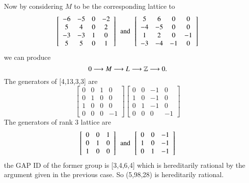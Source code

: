 Now by considering $M$ to be the corresponding lattice to 
$$
\left[ \begin {array}{cccc} -6&-5&0&-2\\5&4&0&2
\\-3&-3&1&0\\5&5&0&1\end {array}
 \right] 
 \,\,\, \text{and} \,\,\,
 \left[ \begin {array}{cccc} 5&6&0&0\\-4&-5&0&0
\\1&2&0&-1\\-3&-4&-1&0
\end {array} \right] 
$$
we can produce
$$
0 \longrightarrow M_{} \longrightarrow L_{} \longrightarrow \mathbb{Z} \longrightarrow 0
.$$
The generators of [4,13,3,3] are 
$$
 \left[ \begin {array}{ccc|c} 0&0&1&0\\ 0&1&0&0
\\ 1&0&0&0\\ \hline 0&0&0&-1\end {array}
 \right] 
 \left[ \begin {array}{ccc|c} 0&0&-1&0\\ 1&0&-1&0
\\ 0&1&-1&0\\ \hline 0&0&0&-1\end {array}
 \right] 
$$
The generators of rank 3 lattice are 
$$
  \left[ \begin {array}{ccc} 0&0&1\\ 0&1&0
\\ 1&0&0\end {array} \right] 
\,\,\, \text{and} \,\,\,
 \left[ \begin {array}{ccc} 0&0&-1\\ 1&0&-1
\\ 0&1&-1\end {array} \right] 
$$
the GAP ID of the former group is [3,4,6,4] which is hereditarily rational by the argument given in the previous case. So (5,98,28) is hereditarily rational.
